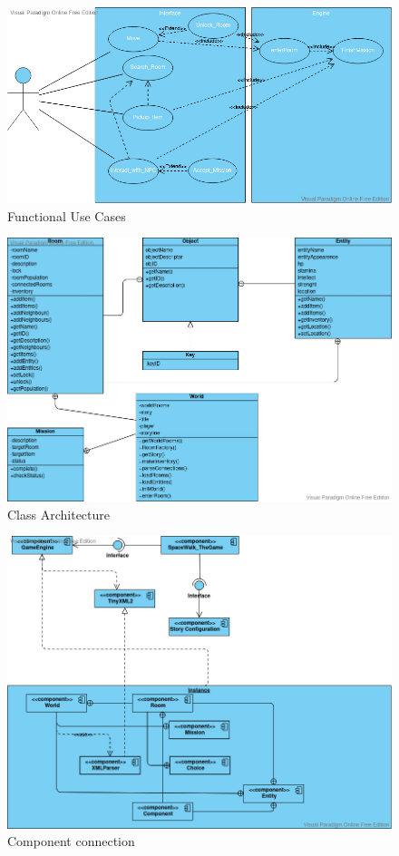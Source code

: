 \documentclass{scrbook}
\begin{document}
\graphicspath{{../Planning/}}
\begin{figure}\centering
    \includegraphics[width=1.0\columnwidth]{Functional_UseCase.jpg}
    \caption{Functional Use Cases}\label{fig:1}
\end{figure}

\begin{figure}
    \includegraphics[width=1.0\columnwidth]{Class_Architecture.jpg}
    \caption{Class Architecture}\label{fig:2}
\end{figure}

\begin{figure}
    \includegraphics[width=1.0\columnwidth]{Component_Connection.jpg}
    \caption{Component connection}\label{fig:3}
\end{figure}
\end{document}
